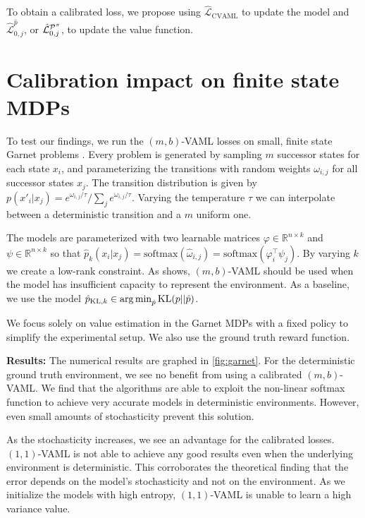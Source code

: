 \begin{boxinsight}
    To obtain a calibrated loss, we propose using $\hat{\mathcal{L}}_\mathrm{CVAML}$ to update the model and $\hat{\mathcal{L}}^{\hat{p}}_{0,j}$, or $\hat{\mathcal{L}}^{\P^\pi}_{0,j}$, to update the value function.
\end{boxinsight}

\section{Calibration impact on finite state MDPs}
\label{sec:empirical1}

To test our findings, we run the $(m,b)$-VAML losses on small, finite state Garnet problems \parencite{bhatnagar2007incremental}.
Every problem is generated by sampling $m$ successor states for each state $x_i$, and parameterizing the transitions with random weights $\omega_{i,j}$ for all successor states $x_j$.
The transition distribution is given by $p(x'_i|x_j) = {e^{\omega_{i,j}/\tau}}/{\sum_j e^{\omega_{i,j}/\tau}}$.
Varying the temperature $\tau$ we can interpolate between a deterministic transition and a $m$ uniform one.

The models are parameterized with two learnable matrices $\varphi \in \mathbb{R}^{n\times k}$ and $\psi \in \mathbb{R}^{n\times k}$ so that $\hat{p}_k(x_i| x_j)  = \mathrm{softmax}(\hat{\omega}_{i,j}) = \mathrm{softmax}(\varphi_i^\top \psi_j)$.
By varying $k$ we create a low-rank constraint.
As \textcite{vaml} shows, $(m,b)$-VAML should be used when the model has insufficient capacity to represent the environment.
As a baseline, we use the model $\hat{p}_{\mathrm{KL}, k}\in \argmin_{\hat{p}} \mathrm{KL}(p||\hat{p})$.

We focus solely on value estimation in the Garnet MDPs with a fixed policy to simplify the experimental setup.
We also use the ground truth reward function.

\textbf{Results:}
The numerical results are graphed in \autoref{fig:garnet}.
For the deterministic ground truth environment, we see no benefit from using a calibrated $(m,b)$-VAML.
We find that the algorithms are able to exploit the non-linear softmax function to achieve very accurate models in deterministic environments.
However, even small amounts of stochasticity prevent this solution.

As the stochasticity increases, we see an advantage for the calibrated losses.
$(1,1)$-VAML is not able to achieve any good results even when the underlying environment is deterministic.
This corroborates the theoretical finding that the error depends on the model's stochasticity and not on the environment.
As we initialize the models with high entropy, $(1,1)$-VAML is unable to learn a high variance value.

